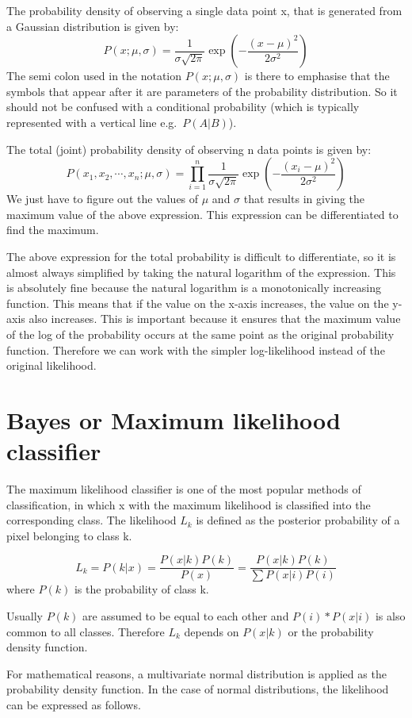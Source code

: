 \documentclass{article}
\begin{document}
The probability density of observing a single data point x, that is generated from a Gaussian distribution is given by:
\[
P(x;\mu,\sigma) = \frac{1}{\sigma\sqrt{2\pi}} \exp \left( -\frac{(x-\mu)^2}{2\sigma^2} \right)
\]
The semi colon used in the notation $P(x; \mu, \sigma)$ is there to emphasise that the symbols that appear after it are parameters of the probability distribution. So it should not be confused with a conditional probability (which is typically represented with a vertical line e.g.\ $P(A| B)$).


The total (joint) probability density of observing n data points is given by:
\[
P(x_1,x_2,\cdots,x_n;\mu,\sigma) = \prod_{i=1}^{n} \frac{1}{\sigma\sqrt{2\pi}} \exp \left( -\frac{(x_i-\mu)^2}{2\sigma^2} \right)
\]
We just have to figure out the values of $\mu$ and $\sigma$ that results in giving the maximum value of the above expression. This expression can be differentiated to find the maximum.

The above expression for the total probability is difficult to differentiate, so it is almost always simplified by taking the natural logarithm of the expression. This is absolutely fine because the natural logarithm is a monotonically increasing function. This means that if the value on the x-axis increases, the value on the y-axis also increases. This is important because it ensures that the maximum value of the log of the probability occurs at the same point as the original probability function. Therefore we can work with the simpler log-likelihood instead of the original likelihood.

\section{Bayes or Maximum likelihood classifier}
The maximum likelihood classifier is one of the most popular methods of classification, in which x with the maximum likelihood is classified into the corresponding class. The likelihood $L_k$ is defined as the posterior probability of a pixel belonging to class k.

\[
L_k = P(k|x) = \frac{P(x|k)P(k)}{P(x)} = \frac{P(x|k)P(k)}{\sum P(x|i)P(i)}
\]
where $P(k)$ is the probability of class k.

Usually $P(k)$ are assumed to be equal to each other and $P(i)*P(x|i)$ is also common to all classes. Therefore $L_k$ depends on $P(x|k)$ or the probability density function.

For mathematical reasons, a multivariate normal distribution is applied as the probability density function. In the case of normal distributions, the likelihood can be expressed as follows.
\end{document}
